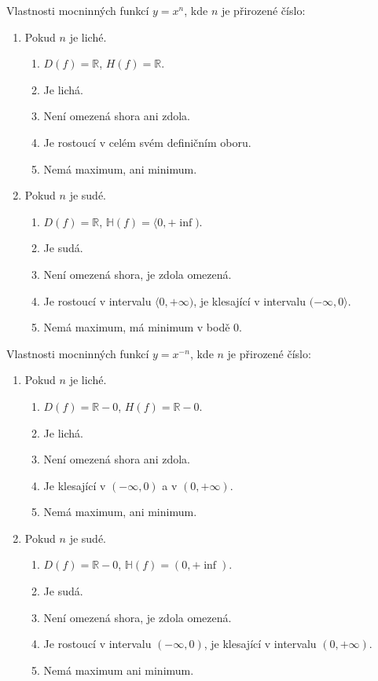 \begin{veta}
  Vlastnosti mocninných funkcí $y= x^n$, kde $n$ je přirozené číslo:
  \begin{enumerate}[1.]
    \item Pokud $n$ je liché.
    \begin{enumerate}[$i.$]
      \item $D(f)= \mathbb R$, $H(f)= \mathbb R$.
      \item Je lichá.
      \item Není omezená shora ani zdola.
      \item Je rostoucí v celém svém definičním oboru.
      \item Nemá maximum, ani minimum.
    \end{enumerate}
    \item Pokud $n$ je sudé.
    \begin{enumerate}[$i.$]
      \item $D(f)= \mathbb R$, $\mathbb H(f)= \langle 0,+\inf )$.
      \item Je sudá.
      \item Není omezená shora, je zdola omezená.
      \item Je rostoucí v intervalu $\langle 0,+\infty )$, je klesající v intervalu $( -\infty,0 \rangle $.
      \item Nemá maximum, má minimum v bodě $0$.
    \end{enumerate}
  \end{enumerate}
\end{veta}

\begin{veta}
  Vlastnosti mocninných funkcí $y= x^{-n}$, kde $n$ je přirozené číslo:
  \begin{enumerate}[1.]
    \item Pokud $n$ je liché.
    \begin{enumerate}[$i.$]
      \item $D(f)= \mathbb R - {0}$, $H(f)= \mathbb R - {0}$.
      \item Je lichá.
      \item Není omezená shora ani zdola.
      \item Je klesající v $( -\infty,0)$ a v $( 0,+\infty )$.
      \item Nemá maximum, ani minimum.
    \end{enumerate}
    \item Pokud $n$ je sudé.
    \begin{enumerate}[$i.$]
      \item $D(f)= \mathbb R - {0}$, $\mathbb H(f)= ( 0,+\inf )$.
      \item Je sudá.
      \item Není omezená shora, je zdola omezená.
      \item Je rostoucí v intervalu $( -\infty,0 ) $, je klesající v intervalu $( 0,+\infty )$.
      \item Nemá maximum ani minimum.
    \end{enumerate}
  \end{enumerate}
\end{veta}

